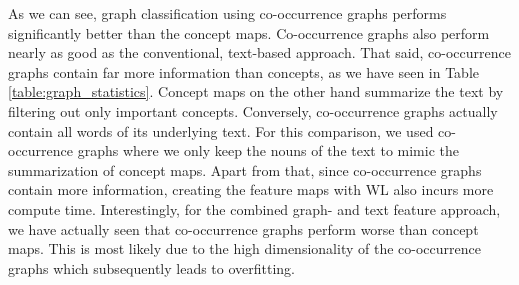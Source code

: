 As we can see, graph classification using co-occurrence graphs performs significantly better than the concept maps.
Co-occurrence graphs also perform nearly as good as the conventional, text-based approach.
That said, co-occurrence graphs contain far more information than concepts, as we have seen in Table \ref{table:graph_statistics}.
Concept maps on the other hand summarize the text by filtering out only important concepts.
Conversely, co-occurrence graphs actually contain all words of its underlying text.
For this comparison, we used co-occurrence graphs where we only keep the nouns of the text to mimic the summarization of concept maps.
Apart from that, since co-occurrence graphs contain more information, creating the feature maps with WL also incurs more compute time.
Interestingly, for the combined graph- and text feature approach, we have actually seen that co-occurrence graphs perform worse than concept maps.
This is most likely due to the high dimensionality of the co-occurrence graphs which subsequently leads to overfitting.

